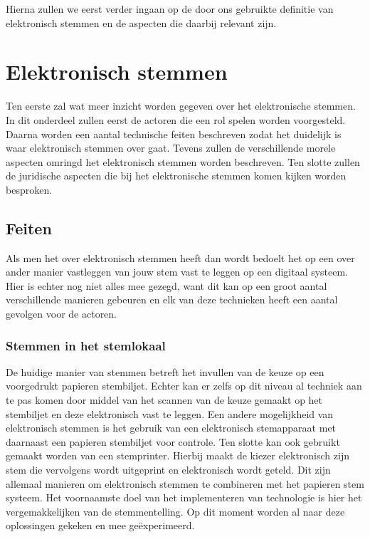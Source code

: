 \documentclass[a4paper]{article}
\begin{document}
Hierna zullen we eerst verder ingaan op de door ons gebruikte definitie van elektronisch stemmen en de aspecten die daarbij relevant zijn.

\section{Elektronisch stemmen}

Ten eerste zal wat meer inzicht worden gegeven over het elektronische stemmen. 
In dit onderdeel zullen eerst de actoren die een rol spelen worden voorgesteld. 
Daarna worden een aantal technische feiten beschreven zodat het duidelijk is waar elektronisch stemmen over gaat.
Tevens zullen de verschillende morele aspecten omringd het elektronisch stemmen worden beschreven.
Ten slotte zullen de juridische aspecten die bij het elektronische stemmen komen kijken worden besproken.

\subsection{Feiten}

Als men het over elektronisch stemmen heeft dan wordt bedoelt het op een over ander manier vastleggen van jouw stem vast te leggen op een digitaal systeem.
Hier is echter nog niet alles mee gezegd, want dit kan op een groot aantal verschillende manieren gebeuren en elk van deze technieken heeft een aantal gevolgen voor de actoren. 

\subsubsection{Stemmen in het stemlokaal}
De huidige manier van stemmen betreft het invullen van de keuze op een voorgedrukt papieren stembiljet. 
Echter kan er zelfs op dit niveau al techniek aan te pas komen door middel van het scannen van de keuze gemaakt op het stembiljet en deze elektronisch vast te leggen.
Een andere mogelijkheid van elektronisch stemmen is het gebruik van een elektronisch stemapparaat met daarnaast een papieren stembiljet voor controle.
Ten slotte kan ook gebruikt gemaakt worden van een stemprinter. 
Hierbij maakt de kiezer elektronisch zijn stem die vervolgens wordt uitgeprint en elektronisch wordt geteld.
Dit zijn allemaal manieren om elektronisch stemmen te combineren met het papieren stem systeem.
Het voornaamste doel van het implementeren van technologie is hier het vergemakkelijken van de stemmentelling.
Op dit moment worden al naar deze oplossingen gekeken en mee ge{\"e}xperimeerd.
\end{document}
